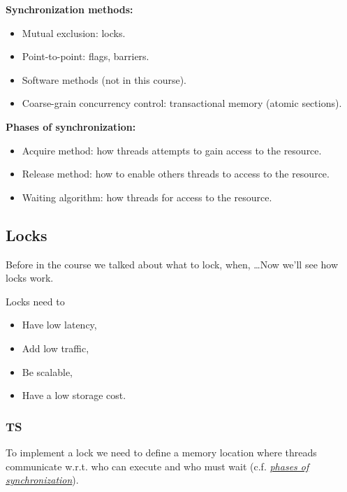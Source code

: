\begin{tcolorbox}[gris]
    \textbf{Synchronization methods:}
    \begin{itemize}[left=10pt, label=\textbullet]
        \item Mutual exclusion: locks. 
        \item Point-to-point: flags, barriers.
        \item Software methods (not in this course). 
        \item Coarse-grain concurrency control: transactional memory (atomic sections).
    \end{itemize}
\end{tcolorbox}
\hypertarget{sinc}{}
\begin{tcolorbox}[gris]
    \textbf{Phases of synchronization:}
    \begin{itemize}[left=10pt, label=\textbullet]
        \item Acquire method: how threads attempts to gain access to the resource. 
        \item Release method: how to enable others threads to access to the resource. 
        \item Waiting algorithm: how threads for access to the resource.
    \end{itemize}
\end{tcolorbox}
\subsection{Locks}
    Before in the course we talked about what to lock, when, \ldots Now we'll see how locks work.
    \begin{tcolorbox}[violet]
        Locks need to 
        \begin{itemize}[left=10pt, label=\textbullet]
            \item Have low latency, 
            \item Add low traffic, 
            \item Be scalable, 
            \item Have a low storage cost.
        \end{itemize}
    \end{tcolorbox}
    \subsubsection{TS}
    To implement a lock we need to define a memory location where threads communicate w.r.t. who can execute and who must wait (c.f. \hyperlink{sinc}{\textit{phases of synchronization}}).

